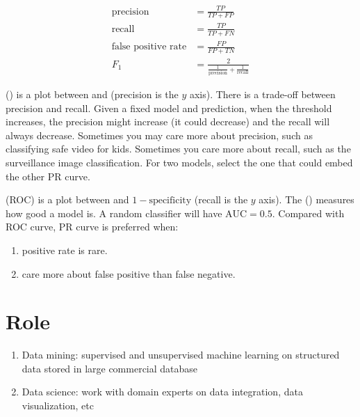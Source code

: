 \begin{equation}
    \begin{aligned}
	\text{precision} &= \frac{TP}{TP + FP} \\
	\text{recall} &= \frac{TP}{TP + FN} \\
	\text{false positive rate} &= \frac{FP}{FP + TN} \\
    F_1 &= \frac{2}{\displaystyle \frac{1}{\text{precision}} + \frac{1}{\text{recall}}}
    \end{aligned}    
\end{equation}




 () is a plot between  and  (precision is the $y$ axis). There is a trade-off between precision and recall. Given a fixed model and prediction, when the threshold increases, the precision might increase (it could decrease) and the recall will always decrease. Sometimes you may care more about precision, such as classifying safe video for kids. Sometimes you care more about recall, such as the surveillance image classification. For two models, select the one that could embed the other PR curve.




 (ROC) is a plot between  and $1 - \text{specificity}$ (recall is the $y$ axis). The  () measures how good a model is. A random classifier will have $\text{AUC} = 0.5$. Compared with ROC curve, PR curve is preferred when:
\begin{enumerate}
	\item positive rate is rare.
	\item care more about false positive than false negative.
\end{enumerate}



\section{Role}

\begin{enumerate}
    \item Data mining: supervised and unsupervised machine learning on structured data stored in large commercial database
    \item Data science: work with domain experts on data integration, data visualization, etc
\end{enumerate}




